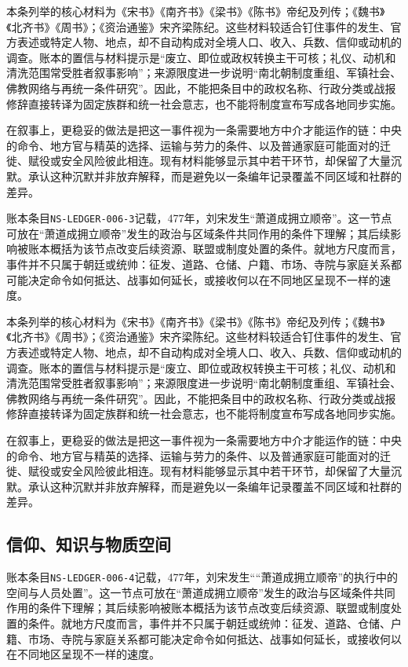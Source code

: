 本条列举的核心材料为《宋书》《南齐书》《梁书》《陈书》帝纪及列传；《魏书》《北齐书》《周书》；《资治通鉴》宋齐梁陈纪。这些材料较适合钉住事件的发生、官方表述或特定人物、地点，却不自动构成对全境人口、收入、兵数、信仰或动机的调查。账本的置信与材料提示是“废立、即位或政权转换主干可核；礼仪、动机和清洗范围常受胜者叙事影响”；来源限度进一步说明“南北朝制度重组、军镇社会、佛教网络与再统一条件研究”。因此，不能把条目中的政权名称、行政分类或战报修辞直接转译为固定族群和统一社会意志，也不能将制度宣布写成各地同步实施。

在叙事上，更稳妥的做法是把这一事件视为一条需要地方中介才能运作的链：中央的命令、地方官与精英的选择、运输与劳力的条件、以及普通家庭可能面对的迁徙、赋役或安全风险彼此相连。现有材料能够显示其中若干环节，却保留了大量沉默。承认这种沉默并非放弃解释，而是避免以一条编年记录覆盖不同区域和社群的差异。

账本条目\texttt{NS-LEDGER-006-3}记载，477年，刘宋发生“萧道成拥立顺帝”。这一节点可放在“萧道成拥立顺帝”发生的政治与区域条件共同作用的条件下理解；其后续影响被账本概括为该节点改变后续资源、联盟或制度处置的条件。就地方尺度而言，事件并不只属于朝廷或统帅：征发、道路、仓储、户籍、市场、寺院与家庭关系都可能决定命令如何抵达、战事如何延长，或接收何以在不同地区呈现不一样的速度。

本条列举的核心材料为《宋书》《南齐书》《梁书》《陈书》帝纪及列传；《魏书》《北齐书》《周书》；《资治通鉴》宋齐梁陈纪。这些材料较适合钉住事件的发生、官方表述或特定人物、地点，却不自动构成对全境人口、收入、兵数、信仰或动机的调查。账本的置信与材料提示是“废立、即位或政权转换主干可核；礼仪、动机和清洗范围常受胜者叙事影响”；来源限度进一步说明“南北朝制度重组、军镇社会、佛教网络与再统一条件研究”。因此，不能把条目中的政权名称、行政分类或战报修辞直接转译为固定族群和统一社会意志，也不能将制度宣布写成各地同步实施。

在叙事上，更稳妥的做法是把这一事件视为一条需要地方中介才能运作的链：中央的命令、地方官与精英的选择、运输与劳力的条件、以及普通家庭可能面对的迁徙、赋役或安全风险彼此相连。现有材料能够显示其中若干环节，却保留了大量沉默。承认这种沉默并非放弃解释，而是避免以一条编年记录覆盖不同区域和社群的差异。

\subsection{信仰、知识与物质空间}

账本条目\texttt{NS-LEDGER-006-4}记载，477年，刘宋发生““萧道成拥立顺帝”的执行中的空间与人员处置”。这一节点可放在“萧道成拥立顺帝”发生的政治与区域条件共同作用的条件下理解；其后续影响被账本概括为该节点改变后续资源、联盟或制度处置的条件。就地方尺度而言，事件并不只属于朝廷或统帅：征发、道路、仓储、户籍、市场、寺院与家庭关系都可能决定命令如何抵达、战事如何延长，或接收何以在不同地区呈现不一样的速度。

